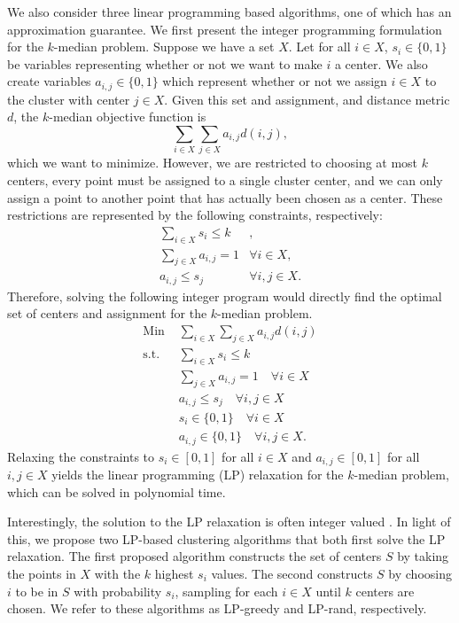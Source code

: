 \documentclass[conference, 10pt, final]{IEEEtran}
\begin{document}
We also consider three linear programming based algorithms, one of which has an approximation guarantee. We first present the integer programming formulation for the $k$-median problem. Suppose we have a set $X$. Let for all $i \in X$, $s_i \in \{0,1\}$ be variables representing whether or not we want to make $i$ a center. We also create variables $a_{i,j} \in \{0, 1\}$ which represent whether or not we assign $i \in X$ to the cluster with center $j \in X$. Given this set and assignment, and distance metric $d$, the $k$-median objective function is 
\begin{equation}
\sum_{i \in X} \sum_{j \in X} a_{i,j} d(i,j), 
\end{equation}
which we want to minimize. However, we are restricted to choosing at most $k$ centers, every point must be assigned to a single cluster center, and we can only assign a point to another point that has actually been chosen as a center. These restrictions are represented by the following constraints, respectively:
\begin{eqnarray}
\sum_{i \in X} s_i   \leq k & ,\\
\sum_{j \in X} a_{i,j}  = 1 & \forall i \in X, \\
a_{i,j}   \leq s_j & \forall i, j \in X.
\end{eqnarray}
Therefore, solving the following integer program would directly find the optimal set of centers and assignment for the $k$-median problem.
\begin{eqnarray}
\text{Min } & \sum_{i \in X} \sum_{j \in X} a_{i,j} d(i,j) \\
\text{s.t. } & \sum_{i \in X} s_i   \leq k  \\
& \sum_{j \in X} a_{i,j}  = 1 \quad \forall i \in X \\
& a_{i,j}   \leq s_j \quad \forall i, j \in X \\
& s_i \in \{0,1\} \quad \forall i \in X \\
& a_{i,j} \in \{0,1\} \quad \forall i, j \in X.
\end{eqnarray}
Relaxing the constraints to $s_i \in [0,1]$ for all $i \in X$ and $a_{i,j} \in [0,1]$ for all $i,j \in X$ yields the linear programming (LP) relaxation for the $k$-median problem, which can be solved in polynomial time.

Interestingly, the solution to the LP relaxation is often integer valued \cite{Nagarajan}. In light of this, we propose two LP-based clustering algorithms that both first solve the LP relaxation.  The first proposed algorithm constructs the set of centers $S$ by taking the points in $X$ with the $k$ highest $s_i$ values.  The second constructs $S$ by choosing $i$ to be in $S$ with probability $s_i$, sampling for each $i \in X$ until $k$ centers are chosen. We refer to these algorithms as LP-greedy and LP-rand, respectively.
\end{document}
